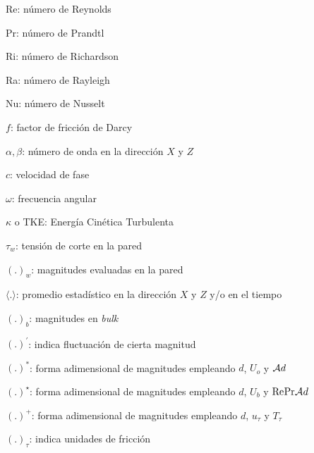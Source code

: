 \documentclass[12pt,screen,twoside]{ibtesis}
\begin{document}
\begin{preliminary}
\begin{abreviaturas}
\begin{itemize}
{\item[] Re: número de Reynolds
\item[] Pr: número de Prandtl
\item[] Ri: número de Richardson
\item[] Ra: número de Rayleigh
\item[] Nu: número de Nusselt
\item[] $f$: factor de fricción de Darcy


\item[] $\alpha,\beta$: número de onda en la dirección $X$ y $Z$ 
\item[] $c$: velocidad de fase
\item[] $\omega$: frecuencia angular

\item[] $\kappa$ o TKE: Energía Cinética Turbulenta

\item[] $\tau_w$: tensión de corte en la pared 

\item[] $(\text{.})_w$: magnitudes evaluadas en la pared
\item[] $\langle \text{.} \rangle$: promedio estadístico en la dirección $X$ y $Z$ y/o en el tiempo
\item[] $(\text{.})_b$: magnitudes en \textit{bulk}
\item[] $(\text{.})^{\prime}$: indica fluctuación de cierta magnitud

\item[] $(\text{.})^{*}$: forma adimensional de magnitudes empleando $d$, $U_o$ y $\mathcal{A} \hspace{0.1mm} d$ 
\item[] $(\text{.})^{\star}$: forma adimensional de magnitudes empleando $d$, $U_b$ y $\text{Re} \hspace{0.1mm} \text{Pr} \hspace{0.1mm} \mathcal{A} \hspace{0.1mm} d $ 
\item[] $(\text{.})^{+}$: forma adimensional de magnitudes empleando $d$, $u_{\tau}$ y $T_{\tau}$
\item[] $(\text{.})_{\tau}$: indica unidades de fricción




}
\end{itemize}
\end{abreviaturas}
\end{preliminary}
\end{document}
